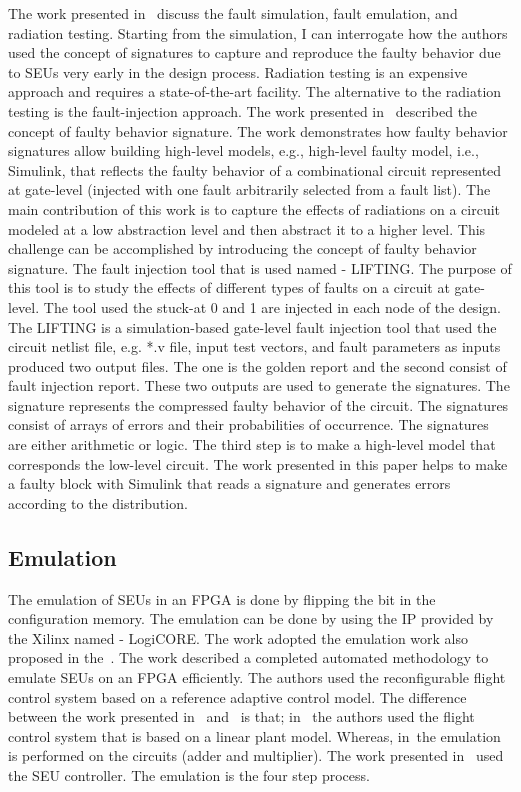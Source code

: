The work presented in~\cite{robache2013methodology} discuss the fault simulation, fault emulation, and radiation testing. Starting from the simulation, I can interrogate how the authors used the concept of signatures to capture and reproduce the faulty behavior due to SEUs very early in the design process.
Radiation testing is an expensive approach and requires a state-of-the-art facility. The alternative to the radiation testing is the fault-injection approach.  The work presented in~\cite{hobeika2014multi} described the concept of faulty behavior signature. The work demonstrates how faulty behavior signatures allow building high-level models, e.g., high-level faulty model, i.e., Simulink, that reflects the faulty behavior of a combinational circuit represented at gate-level  (injected with one fault arbitrarily selected from a fault list). The main contribution of this work is to capture the effects of radiations on a circuit modeled at a low abstraction level and then abstract it to a  higher level. This challenge can be accomplished by introducing the concept of faulty behavior signature.  The fault injection tool that is used named - LIFTING.  The purpose of this tool is to study the effects of different types of faults on a circuit at gate-level. The tool used the stuck-at 0 and 1 are injected in each node of the design. The LIFTING is a simulation-based gate-level fault injection tool that used the circuit netlist file, e.g.  *.v file, input test vectors, and fault parameters as inputs produced two output files. The one is the golden report and the second consist of fault injection report. These two outputs are used to generate the signatures.  The signature represents the compressed faulty behavior of the circuit. The signatures consist of arrays of errors and their probabilities of occurrence. The signatures are either arithmetic or logic.  The third step is to make a high-level model that corresponds the low-level circuit. The work presented in this paper helps to make a faulty block with Simulink that reads a signature and generates errors according to the distribution.

\subsection{Emulation}
The emulation of SEUs in an FPGA is done by flipping the bit in the configuration memory. The emulation can be done by using the IP provided by the Xilinx named - LogiCORE. The work adopted the emulation work also proposed in the~\cite{hobeika2013flight}.  The work described a completed automated methodology to emulate SEUs on an FPGA efficiently. The authors used the reconfigurable flight control system based on a reference adaptive control model. The difference between the work presented in~\cite{hobeika2014multi} and~\cite{hobeika2013flight} is that; in~\cite{hobeika2013flight} the authors used the flight control system that is based on a linear plant model. Whereas, in~\cite{hobeika2014multi}the emulation is performed on the circuits (adder and multiplier). The work presented in~\cite{hobeika2014multi} used the SEU controller. The emulation is the four step process.

